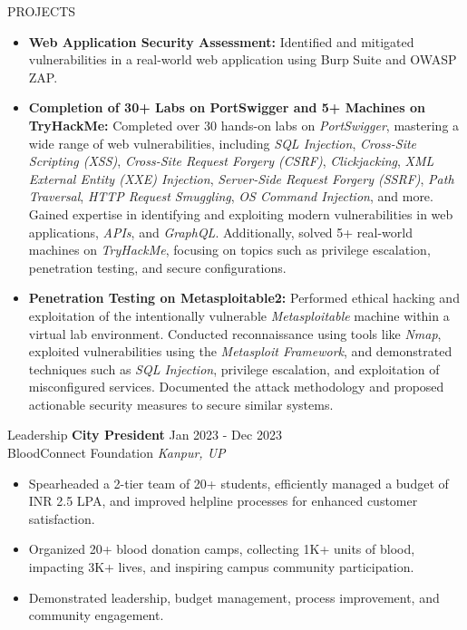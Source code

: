 \documentclass{resume} %
\begin{document}
\begin{rSection}{PROJECTS}
\begin{itemize}
    \item \textbf{Web Application Security Assessment:} Identified and mitigated vulnerabilities in a real-world web application using Burp Suite and OWASP ZAP.
    \item \textbf{Completion of 30+ Labs on PortSwigger and 5+ Machines on TryHackMe:} {Completed over 30 hands-on labs on \textit{PortSwigger}, mastering a wide range of web vulnerabilities, including \textit{SQL Injection}, \textit{Cross-Site Scripting (XSS)}, \textit{Cross-Site Request Forgery (CSRF)}, \textit{Clickjacking}, \textit{XML External Entity (XXE) Injection}, \textit{Server-Side Request Forgery (SSRF)}, \textit{Path Traversal}, \textit{HTTP Request Smuggling}, \textit{OS Command Injection}, and more. Gained expertise in identifying and exploiting modern vulnerabilities in web applications, \textit{APIs}, and \textit{GraphQL}. Additionally, solved 5+ real-world machines on \textit{TryHackMe}, focusing on topics such as privilege escalation, penetration testing, and secure configurations.}
    \item \textbf{Penetration Testing on Metasploitable2:} {Performed ethical hacking and exploitation of the intentionally vulnerable \textit{Metasploitable} machine within a virtual lab environment. Conducted reconnaissance using tools like \textit{Nmap}, exploited vulnerabilities using the \textit{Metasploit Framework}, and demonstrated techniques such as \textit{SQL Injection}, privilege escalation, and exploitation of misconfigured services. Documented the attack methodology and proposed actionable security measures to secure similar systems.}
\end{itemize}
\end{rSection}



\begin{rSection}{Leadership}
\textbf{City President} \hfill Jan 2023 - Dec 2023\\
BloodConnect Foundation \hfill \textit{Kanpur, UP}
\begin{itemize}[noitemsep]
    \item Spearheaded a 2-tier team of 20+ students, efficiently managed a budget of INR 2.5 LPA, and improved helpline processes for enhanced customer satisfaction.
    \item Organized 20+ blood donation camps, collecting 1K+ units of blood, impacting 3K+ lives, and inspiring campus community participation.
    \item Demonstrated leadership, budget management, process improvement, and community engagement.
\end{itemize}
\end{rSection}
\end{document}
